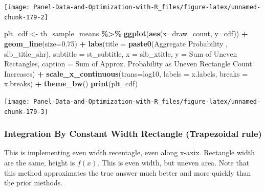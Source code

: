 \documentclass[
]{book}
\newenvironment{Shaded}{\begin{snugshade}}{\end{snugshade}}
\newcommand{\DataTypeTok}[1]{\textcolor[rgb]{0.13,0.29,0.53}{#1}}
\newcommand{\FloatTok}[1]{\textcolor[rgb]{0.00,0.00,0.81}{#1}}
\newcommand{\KeywordTok}[1]{\textcolor[rgb]{0.13,0.29,0.53}{\textbf{#1}}}
\newcommand{\NormalTok}[1]{#1}
\newcommand{\OperatorTok}[1]{\textcolor[rgb]{0.81,0.36,0.00}{\textbf{#1}}}
\newcommand{\StringTok}[1]{\textcolor[rgb]{0.31,0.60,0.02}{#1}}
\begin{document}
\begin{center}\texttt{[image: Panel-Data-and-Optimization-with-R\_files/figure-latex/unnamed-chunk-179-2]} \end{center}

\begin{Shaded}
\begin{Highlighting}[]
\NormalTok{plt\_cdf \textless{}{-}}\StringTok{ }\NormalTok{tb\_sample\_means }\OperatorTok{\%\textgreater{}\%}
\StringTok{  }\KeywordTok{ggplot}\NormalTok{(}\KeywordTok{aes}\NormalTok{(}\DataTypeTok{x=}\NormalTok{draw\_count, }\DataTypeTok{y=}\NormalTok{cdf)) }\OperatorTok{+}
\StringTok{  }\KeywordTok{geom\_line}\NormalTok{(}\DataTypeTok{size=}\FloatTok{0.75}\NormalTok{) }\OperatorTok{+}
\StringTok{  }\KeywordTok{labs}\NormalTok{(}\DataTypeTok{title =} \KeywordTok{paste0}\NormalTok{(}\StringTok{\textquotesingle{}Aggregate Probability \textquotesingle{}}\NormalTok{, slb\_title\_shr),}
       \DataTypeTok{subtitle =}\NormalTok{ st\_subtitle,}
       \DataTypeTok{x =}\NormalTok{ slb\_xtitle,}
       \DataTypeTok{y =} \StringTok{\textquotesingle{}Sum of Uneven Rectangles\textquotesingle{}}\NormalTok{,}
       \DataTypeTok{caption =} \StringTok{\textquotesingle{}Sum of Approx. Probability as Uneven Rectangle Count Increases\textquotesingle{}}\NormalTok{) }\OperatorTok{+}
\StringTok{  }\KeywordTok{scale\_x\_continuous}\NormalTok{(}\DataTypeTok{trans=}\StringTok{\textquotesingle{}log10\textquotesingle{}}\NormalTok{, }\DataTypeTok{labels =}\NormalTok{ x.labels, }\DataTypeTok{breaks =}\NormalTok{ x.breaks) }\OperatorTok{+}
\StringTok{  }\KeywordTok{theme\_bw}\NormalTok{()}
\KeywordTok{print}\NormalTok{(plt\_cdf)}
\end{Highlighting}
\end{Shaded}

\begin{center}\texttt{[image: Panel-Data-and-Optimization-with-R\_files/figure-latex/unnamed-chunk-179-3]} \end{center}

\hypertarget{integration-by-constant-width-rectangle-trapezoidal-rule}{%
\subsubsection{Integration By Constant Width Rectangle (Trapezoidal rule)}\label{integration-by-constant-width-rectangle-trapezoidal-rule}}

This is implementing even width recentagle, even along x-axix. Rectangle width are the same, height is \(f(x)\). This is even width, but uneven area. Note that this method approximates the true answer much better and more quickly than the prior methods.
\end{document}
